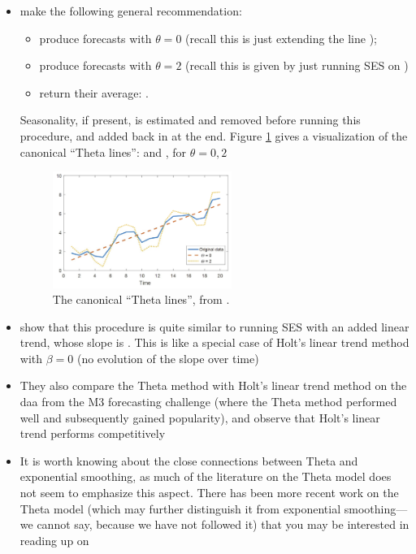 \documentclass{article}
\begin{document}
\begin{itemize}
\item \citet{assimakopoulos2000theta} make the following general recommendation:
  \begin{itemize}
  \item produce forecasts  with $\theta = 0$ (recall 
    this is just extending the line );
  \item produce forecasts  with $\theta = 2$ (recall 
    this is given by just running SES on ) 
  \item return their average: . 
  \end{itemize}
  Seasonality, if present, is estimated and removed before running this
  procedure, and added back in at the end. Figure \ref{fig:theta} gives a
  visualization of the canonical ``Theta lines'':  and 
  , for $\theta = 0,2$

\begin{figure}[htb]
\centering
\includegraphics[width=0.55\textwidth]{theta.png}
\caption{The canonical ``Theta lines'', from \citet{dudek2019short}.}      
\label{fig:theta}
\end{figure}

\item \citet{hyndman2003unmasking} show that this procedure is quite similar to
  running SES with an added linear trend, whose slope is . This is like a special case of Holt's linear trend method with $\beta =
  0$ (no evolution of the slope over time)   

\item They also compare the Theta method with Holt's linear trend method on the
  daa from the M3 forecasting challenge (where the Theta method performed well
  and subsequently gained popularity), and observe that Holt's linear trend
  performs competitively  

\item It is worth knowing about the close connections between Theta and
  exponential smoothing, as much of the literature on the Theta model does not
  seem to emphasize this aspect. There has been more recent work on the Theta
  model (which may further distinguish it from exponential smoothing---we cannot
  say, because we have not followed it) that you may be interested in reading up
  on    
\end{itemize}
\end{document}
